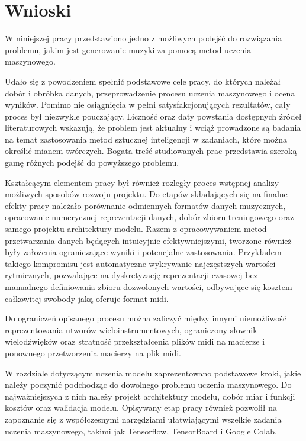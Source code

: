 \chapter{Wnioski}\label{chap:concl}
{
    W niniejszej pracy przedstawiono jedno z możliwych podejść do rozwiązania problemu,
    jakim jest generowanie muzyki za pomocą metod uczenia maszynowego. 

    Udało się z powodzeniem spełnić podstawowe cele pracy, do których należał dobór i obróbka danych, 
    przeprowadzenie procesu uczenia maszynowego i ocena wyników. Pomimo nie osiągnięcia w pełni satysfakcjonujących rezultatów, cały proces był niezwykle pouczający. 
    Liczność oraz daty powstania dostępnych źródeł literaturowych wskazują, że problem jest aktualny 
    i wciąż prowadzone są badania na temat zastosowania metod sztucznej inteligencji w zadaniach, 
    które można określić mianem twórczych. Bogata treść studiowanych prac przedstawia szeroką gamę 
    różnych podejść do powyższego problemu.

    Kształcącym elementem pracy był również rozległy proces wstępnej analizy możliwych sposobów
    rozwoju projektu. Do etapów składających się na finalne efekty pracy należało porównanie odmiennych 
    formatów danych muzycznych, opracowanie numerycznej reprezentacji danych, dobór zbioru treningowego
    oraz samego projektu architektury modelu. 
    Razem z opracowywaniem metod przetwarzania danych będących intuicyjnie efektywniejszymi, tworzone również były założenia
    ograniczające wyniki i potencjalne zastosowania. Przykładem takiego kompromisu jest automatyczne wykrywanie
    najczęstszych wartości rytmicznych, pozwalające na dyskretyzację reprezentacji czasowej bez
    manualnego definiowania zbioru dozwolonych wartości, odbywające się kosztem całkowitej swobody jaką oferuje format midi.
    
    Do ograniczeń opisanego procesu można zaliczyć między innymi niemożliwość reprezentowania utworów wieloinstrumentowych, 
    ograniczony słownik wielodźwięków oraz stratność przekształcenia plików midi na macierze i ponownego przetworzenia
    macierzy na plik midi.

    W rozdziale dotyczącym uczenia modelu zaprezentowano podstawowe kroki, jakie należy poczynić podchodząc do
    dowolnego problemu uczenia maszynowego. Do najważniejszych z nich należy projekt architektury modelu,
    dobór miar i funkcji kosztów oraz walidacja modelu. Opisywany etap pracy również pozwolił na zapoznanie 
    się z współczesnymi narzędziami ułatwiającymi wszelkie zadania uczenia maszynowego, takimi jak Tensorflow, 
    TensorBoard i Google Colab. 

}

